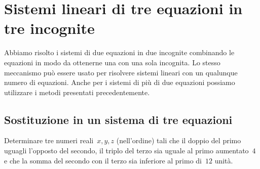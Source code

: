 \section{Sistemi lineari di tre equazioni in tre incognite}
\label{sec:compl1_sistemitreeq}
Abbiamo risolto i sistemi di due equazioni in due incognite combinando le 
equazioni in modo da ottenerne una con una sola incognita.
Lo stesso meccanismo può essere usato per risolvere sistemi lineari con un 
qualunque numero di equazioni.
Anche per i sistemi di più di due equazioni possiamo utilizzare i metodi 
presentati precedentemente.

\subsection{Sostituzione in un sistema di tre equazioni}

\begin{problema}{}{}
Determinare tre numeri reali~\(x, y, z\) (nell'ordine) tali
che il doppio del primo uguagli l'opposto del secondo,
il triplo del terzo sia uguale al primo aumentato~\(4\)
e che la somma del secondo con il terzo sia inferiore al primo di~\(12\) 
unità.
\end{problema}

